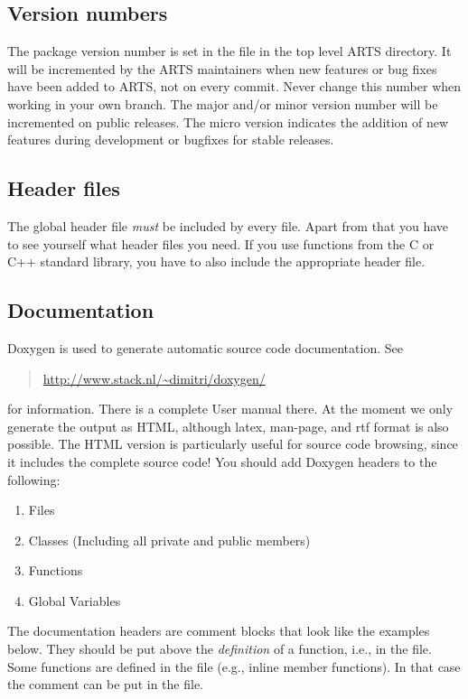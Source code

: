 \subsection{Version numbers} 
The package version number is set in the  file in the top
level ARTS directory. It will be incremented by the ARTS maintainers when new
features or bug fixes have been added to ARTS, not on every commit. Never
change this number when working in your own branch. The major and/or minor
version number will be incremented on public releases. The micro version
indicates the addition of new features during development or bugfixes for
stable releases.

\subsection{Header files} 
The global header file  \emph{must} be included by every
file. Apart from that you have to see yourself what header files you
need. If you use functions from the C or C++ standard library, you
have to also include the appropriate header file.

\subsection{Documentation}
Doxygen is used to generate automatic source code documentation. See
\begin{quote}
  \url{http://www.stack.nl/\~dimitri/doxygen/}
\end{quote}
for information. There is a complete User manual there. At the moment
we only generate the output as HTML, although latex, man-page, and rtf
format is also possible. The HTML version is particularly useful for
source code browsing, since it includes the complete source code! You
should add Doxygen headers to the following:

\begin{enumerate}
\item Files
\item Classes (Including all private and public members)
\item Functions
\item Global Variables
\end{enumerate}

The documentation headers are comment blocks that look like the
examples below. They should be put above the \emph{definition} of a
function, i.e., in the  file.  Some functions are defined in
the  file (e.g., inline member functions). In that case the
comment can be put in the  file.

